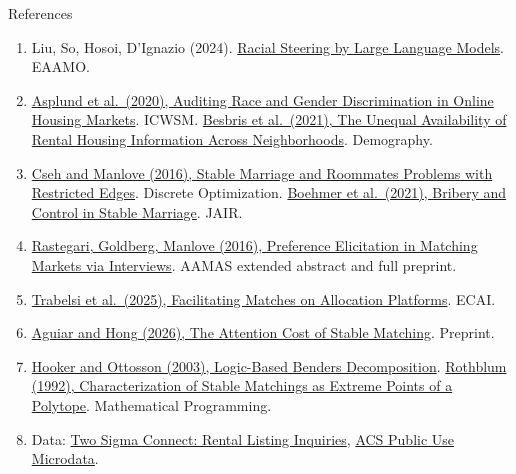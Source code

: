 \documentclass[aspectratio=169,14pt]{beamer}
\begin{document}
\begin{frame}[t]{References}
\fontsize{9.2}{11}\selectfont
\begin{enumerate}
\setlength{\itemsep}{2pt}
\item Liu, So, Hosoi, D'Ignazio (2024).
\href{https://r-t-lab.org/works/housing-gpt-audit/}{Racial Steering by Large Language Models}.
EAAMO.
\item \href{https://ojs.aaai.org/index.php/ICWSM/article/view/7276}{Asplund et al.\ (2020), Auditing Race and Gender Discrimination in Online Housing Markets}.
ICWSM.
\href{https://doi.org/10.1215/00703370-9357518}{Besbris et al.\ (2021), The Unequal Availability of Rental Housing Information Across Neighborhoods}.
Demography.
\item \href{https://doi.org/10.1016/j.disopt.2016.03.002}{Cseh and Manlove (2016), Stable Marriage and Roommates Problems with Restricted Edges}.
Discrete Optimization.
\href{https://doi.org/10.1613/jair.1.12755}{Boehmer et al.\ (2021), Bribery and Control in Stable Marriage}.
JAIR.
\item \href{https://arxiv.org/abs/1602.04792}{Rastegari, Goldberg, Manlove (2016), Preference Elicitation in Matching Markets via Interviews}.
AAMAS extended abstract and full preprint.
\item \href{https://arxiv.org/abs/2508.18325}{Trabelsi et al.\ (2025), Facilitating Matches on Allocation Platforms}.
ECAI.
\item \href{https://arxiv.org/abs/2609.09693}{Aguiar and Hong (2026), The Attention Cost of Stable Matching}.
Preprint.
\item \href{https://doi.org/10.1007/s10107-003-0375-9}{Hooker and Ottosson (2003), Logic-Based Benders Decomposition}.
\href{https://doi.org/10.1007/BF01586041}{Rothblum (1992), Characterization of Stable Matchings as Extreme Points of a Polytope}.
Mathematical Programming.
\item Data:
\href{https://www.kaggle.com/competitions/two-sigma-connect-rental-listing-inquiries/data}{Two Sigma Connect: Rental Listing Inquiries},
\href{https://www.census.gov/programs-surveys/acs/microdata.html}{ACS Public Use Microdata}.
\end{enumerate}
\end{frame}
\end{document}
